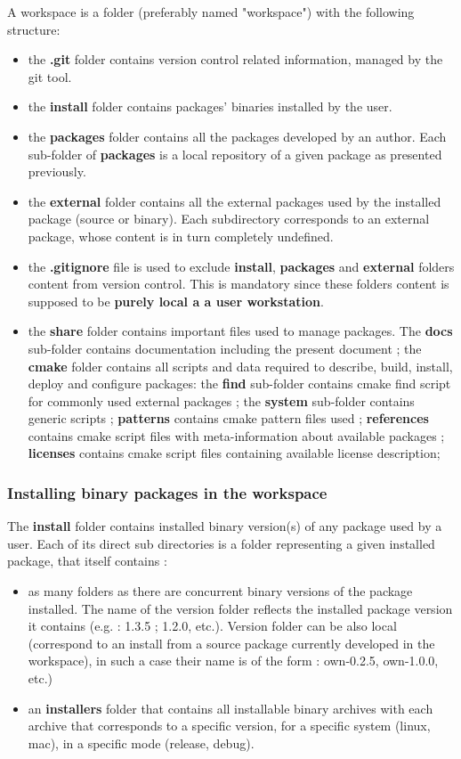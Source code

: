 \documentclass[12pt,a4paper]{article}
\begin{document}
A workspace is a folder (preferably named "workspace") with the following structure:
\begin{itemize}
\item the \textbf{.git} folder contains version control related information, managed by the git tool.

\item the \textbf{install} folder contains packages' binaries installed by the user. 
\item the \textbf{packages} folder contains all the packages developed by an author. Each sub-folder of \textbf{packages} is a local repository of a given package as presented previously.
\item the \textbf{external} folder contains all the external packages used by the installed package (source or binary). Each subdirectory corresponds to an external package, whose content is in turn completely undefined.
\item the \textbf{.gitignore} file is used to exclude  \textbf{install}, \textbf{packages} and \textbf{external} folders content from version control. This is mandatory since these folders content is supposed to be \textbf{ purely local a a user workstation}.
\item the \textbf{share} folder contains important files used to manage packages. The \textbf{docs} sub-folder contains documentation including the present document ; the \textbf{cmake} folder contains all scripts and data required to describe, build, install, deploy and configure packages: the \textbf{find} sub-folder contains cmake find script for commonly used external packages ; the \textbf{system} sub-folder contains generic scripts ; \textbf{patterns} contains cmake pattern files used ; \textbf{references} contains cmake script files with meta-information about available packages ; \textbf{licenses} contains cmake script files containing available license description; 
\end{itemize}

\subsubsection{Installing binary packages in the workspace}
\label{sec:workspaceInstall}

The \textbf{install} folder contains installed binary version(s) of any package used by a user. Each of its direct sub directories is a folder representing a given installed package, that itself contains :
\begin{itemize}
\item as many folders as there are concurrent binary versions of the package installed. The name of the version folder reflects the installed package version it contains (e.g. : 1.3.5 ; 1.2.0, etc.). Version folder can be also local (correspond to an install from a source package currently developed in the workspace), in such a case their name is of the form : own-0.2.5, own-1.0.0, etc.)
\item an \textbf{installers} folder that contains all installable binary archives with each archive that corresponds to a specific version, for a specific system (linux, mac), in a specific mode (release, debug).
\end{itemize}
\end{document}
